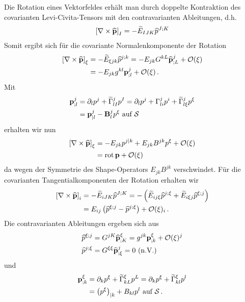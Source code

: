 \documentclass[a4paper,11pt]{scrartcl}
\newcommand{\landau}{\mathcal{O}}
\newcommand{\tildeCh}[3]{\widetilde{\Gamma}_{#1 #2}^{#3}} %
\newcommand{\Ch}[3]{\Gamma_{#1 #2}^{#3}} %
\begin{document}
Die Rotation eines Vektorfeldes erhält man durch doppelte Kontraktion des covarianten Levi-Civita-Tensors mit den contravarianten
Ableitungen, d.h.
\begin{align}
  \left[ \nabla\times\widehat{\mathbf{p}} \right]_{I} = -\widetilde{E}_{IJK}\widehat{p}^{J;K}
\end{align}
Somit ergibt sich für die covariante Normalenkomponente der Rotation
\begin{align}
  \left[ \nabla\times\pExt \right]_{\xi} 
        &= -\widetilde{E}_{\xi jk}\pIExt^{j;k}
         = -E_{jk}G^{kL}\tensor{\pIExt}{^{j}_{;L}} + \landau(\xi)\\
        &= -E_{jk}g^{kl}\tensor{p}{^{j}_{;l}} + \landau(\xi)\formPeriod
\end{align}
Mit
\begin{align}
  \tensor{p}{^{j}_{;l}} &= \partial_{l}p^{j} + \tildeCh{l}{I}{j}p^{I}
                         = \partial_{l}p^{j} + \Ch{l}{i}{j}p^{i} + \tildeCh{l}{\xi}{j}p^{\xi}\\
                        &= \tensor{p}{^{j}_{|l}} - \tensor{B}{_{l}^{j}}p^{\xi}
                        \text{ auf }\surf
\end{align}
erhalten wir nun
\begin{align}
  \left[ \nabla\times\pExt \right]_{\xi}
    &= -E_{jk}p^{j|k} + E_{jk}B^{jk}p^{\xi} + \landau(\xi)\\
    &= \rot\pb + \landau(\xi)
                                       \label{eq:rotnorm}
\end{align}
da wegen der Symmetrie des Shape-Operators \(  E_{jk}B^{jk} \) verschwindet.
Für die covarianten Tangentialkomponenten der Rotation erhalten wir
\begin{align}
  \left[ \nabla\times\pExt \right]_{i}
    &= -\widetilde{E}_{iJK}\pIExt^{J;K}
     = -\left( \widetilde{E}_{ij\xi}\pIExt^{j;\xi} +  \widetilde{E}_{i\xi j}\pIExt^{\xi;j}\right) \\
    &= E_{ij}\left(\pIExt^{\xi;j} - \pIExt^{j;\xi}\right) + \landau(\xi)_{i} \formPeriod
\end{align}
Die contravarianten Ableitungen ergeben sich aus
\begin{align}
  \pIExt^{\xi;j} &= G^{jK}\tensor{\pIExt}{^{\xi}_{;K}} = g^{jk}\tensor{p}{^{\xi}_{;k}} +  \landau(\xi)^{j}\\
  \pIExt^{j;\xi} &= G^{\xi \xi}\tensor{\pIExt}{^{j}_{;\xi}} = 0 \text{ (n.V.)}
\end{align}
und
\begin{align}
  \tensor{p}{^{\xi}_{;k}} &= \partial_{k}p^{\xi} + \tildeCh{k}{L}{\xi}p^{L}
                           =\partial_{k}p^{\xi} + \tildeCh{k}{l}{\xi}p^{l}\\
                          &= \left( p^{\xi} \right)_{|k} + B_{kl}p^{l} \text{ auf }\surf \formPeriod
\end{align}
\end{document}

